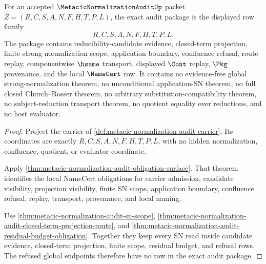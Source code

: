 \begin{theorem}
\label{thm:metacic-normalization-audit-obligation-pack}
For an accepted $\MetacicNormalizationAuditUp$ packet $Z=(R,C,S,A,N,F,H,T,P,L)$, the exact audit package is the displayed row family
$$
R,C,S,A,N,F,H,T,P,L .
$$
The package contains reducibility-candidate evidence, closed-term projection, finite strong-normalization scope, application boundary, confluence refusal, route replay, componentwise $\hsame$ transport, displayed $\Cont$ replay, $\Pkg$ provenance, and the local $\NameCert$ row. It contains no evidence-free global strong-normalization theorem, no unconditional application-SN theorem, no full closed Church--Rosser theorem, no arbitrary substitution-compatibility theorem, no subject-reduction transport theorem, no quotient equality over reductions, and no host evaluator.
\end{theorem}
\begin{proof}
Project the carrier of \autoref{def:metacic-normalization-audit-carrier}. Its coordinates are exactly $R,C,S,A,N,F,H,T,P,L$, with no hidden normalization, confluence, quotient, or evaluator coordinate.

Apply \autoref{thm:metacic-normalization-audit-obligation-surface}. That theorem identifies the local NameCert obligations for carrier admission, candidate visibility, projection visibility, finite SN scope, application boundary, confluence refusal, replay, transport, provenance, and local naming.

Use \autoref{thm:metacic-normalization-audit-sn-scope}, \autoref{thm:metacic-normalization-audit-closed-term-projection-route}, and \autoref{thm:metacic-normalization-audit-residual-budget-obligation}. Together they keep every SN read inside candidate evidence, closed-term projection, finite scope, residual budget, and refusal rows. The refused global endpoints therefore have no row in the exact audit package.
\end{proof}

